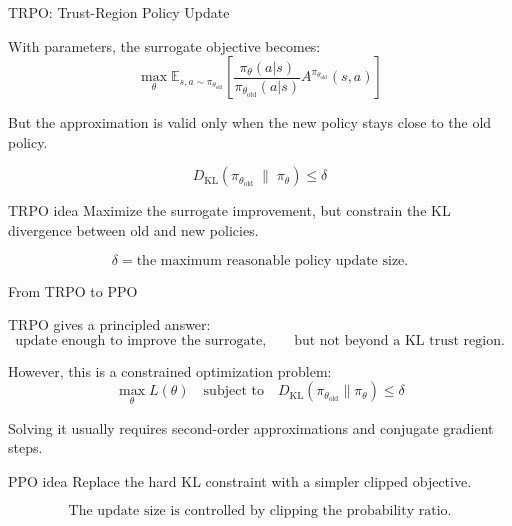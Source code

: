 \documentclass{beamer}
\begin{document}
\begin{frame}{TRPO: Trust-Region Policy Update}

\small

With parameters, the surrogate objective becomes:
\[
\max_{\theta}
\mathbb{E}_{s,a\sim\pi_{\theta_{\mathrm{old}}}}
\left[
\frac{
\pi_{\theta}(a|s)
}{
\pi_{\theta_{\mathrm{old}}}(a|s)
}
A^{\pi_{\theta_{\mathrm{old}}}}(s,a)
\right]
\]

\vspace{0.1cm}

But the approximation is valid only when the new policy stays close
to the old policy.

\[
D_{\mathrm{KL}}
\left(
\pi_{\theta_{\mathrm{old}}}
\;\|\;
\pi_{\theta}
\right)
\leq
\delta
\]

\begin{block}{TRPO idea}
Maximize the surrogate improvement, but constrain the KL divergence
between old and new policies.
\end{block}

\[
\delta
=
\text{the maximum reasonable policy update size.}
\]

\end{frame}

\begin{frame}{From TRPO to PPO}

\small

TRPO gives a principled answer:
\[
\text{update enough to improve the surrogate,}
\qquad
\text{but not beyond a KL trust region.}
\]

\vspace{0.15cm}

However, this is a constrained optimization problem:
\[
\max_\theta L(\theta)
\quad
\text{subject to}
\quad
D_{\mathrm{KL}}
\left(
\pi_{\theta_{\mathrm{old}}}
\|\pi_\theta
\right)
\leq \delta
\]

\vspace{0.15cm}

Solving it usually requires second-order approximations and conjugate
gradient steps.

\begin{block}{PPO idea}
Replace the hard KL constraint with a simpler clipped objective.
\end{block}

\[
\text{The update size is controlled by clipping the probability ratio.}
\]

\end{frame}
\end{document}
